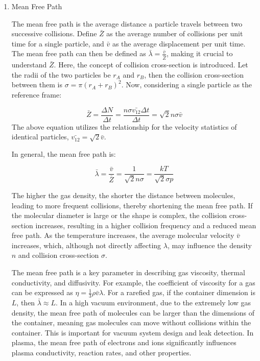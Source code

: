 \begin{enumerate}
\begin{enumerate}
		\item Mean Free Path
		
		The mean free path is the average distance a particle travels between two successive collisions. Define $\bar{Z}$ as the average number of collisions per unit time for a single particle, and $\bar{v}$ as the average displacement per unit time. The mean free path can then be defined as $\bar{\lambda}=\frac{\bar{v}}{\bar{Z}}$, making it crucial to understand $\bar{Z}$. Here, the concept of collision cross-section is introduced. Let the radii of the two particles be $r_A$ and $r_B$, then the collision cross-section between them is $\sigma= \pi(r_A + r_B)^2$. Now, considering a single particle as the reference frame:
		
		$$
		\bar{Z}=\frac{\Delta N}{\Delta t}=\frac{n \sigma \bar{v_{12}} \Delta t}{\Delta t}=\sqrt{2} n \sigma \bar{v}
		$$
		The above equation utilizes the relationship for the velocity statistics of identical particles, $\bar{v_{12}} = \sqrt{2}\bar{v}$.
		
		In general, the mean free path is:
		
		$$
		\bar{\lambda}=\frac{\bar{v}}{\bar{Z}}=\frac{1}{\sqrt{2} n \sigma}=\frac{k T}{\sqrt{2} \sigma p}
		$$
		
		The higher the gas density, the shorter the distance between molecules, leading to more frequent collisions, thereby shortening the mean free path. If the molecular diameter is large or the shape is complex, the collision cross-section increases, resulting in a higher collision frequency and a reduced mean free path. As the temperature increases, the average molecular velocity \( \bar{v} \) increases, which, although not directly affecting \( \lambda \), may influence the density \( n \) and collision cross-section \( \sigma \).
		
		The mean free path is a key parameter in describing gas viscosity, thermal conductivity, and diffusivity. For example, the coefficient of viscosity for a gas can be expressed as \( \eta = \frac{1}{3} \rho \bar{v} \lambda \). For a rarefied gas, if the container dimension is $L$, then $\bar{\lambda}\approx L$. In a high vacuum environment, due to the extremely low gas density, the mean free path of molecules can be larger than the dimensions of the container, meaning gas molecules can move without collisions within the container. This is important for vacuum system design and leak detection. In plasma, the mean free path of electrons and ions significantly influences plasma conductivity, reaction rates, and other properties.
		

\end{enumerate}
\end{enumerate}

